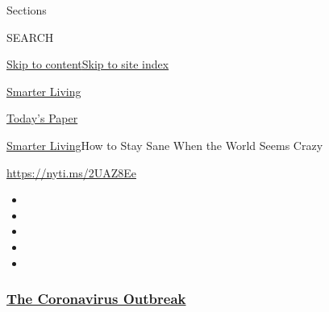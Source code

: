 Sections

SEARCH

\protect\hyperlink{site-content}{Skip to
content}\protect\hyperlink{site-index}{Skip to site index}

\href{https://www.nytimes3xbfgragh.onion/section/smarter-living}{Smarter
Living}

\href{https://myaccount.nytimes3xbfgragh.onion/auth/login?response_type=cookie\&client_id=vi}{}

\href{https://www.nytimes3xbfgragh.onion/section/todayspaper}{Today's
Paper}

\href{/section/smarter-living}{Smarter Living}\textbar{}How to Stay Sane
When the World Seems Crazy

\url{https://nyti.ms/2UAZ8Ee}

\begin{itemize}
\item
\item
\item
\item
\item
\end{itemize}

\hypertarget{the-coronavirus-outbreak}{%
\subsubsection{\texorpdfstring{\href{https://www.nytimes3xbfgragh.onion/news-event/coronavirus?name=styln-coronavirus-national\&region=TOP_BANNER\&block=storyline_menu_recirc\&action=click\&pgtype=Article\&impression_id=f1e894a0-f4b9-11ea-977b-75df3e68102f\&variant=undefined}{The
Coronavirus
Outbreak}}{The Coronavirus Outbreak}}\label{the-coronavirus-outbreak}}

